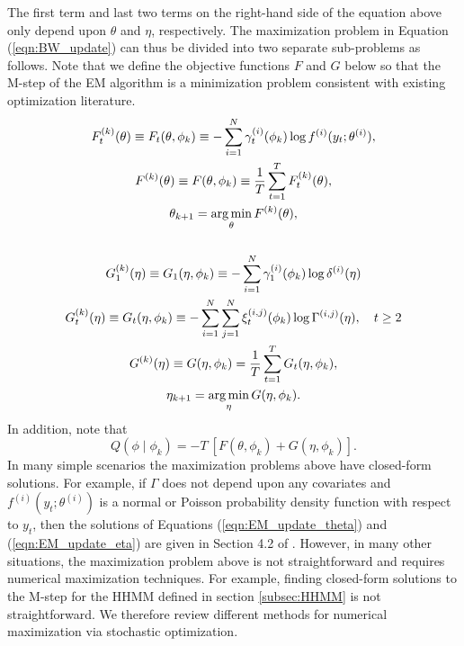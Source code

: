 The first term and last two terms on the right-hand side of the equation above only depend upon $\theta$ and $\eta$, respectively. The maximization problem in Equation (\ref{eqn:BW_update}) can thus be divided into two separate sub-problems as follows. Note that we define the objective functions $F$ and $G$ below so that the M-step of the EM algorithm is a minimization problem consistent with existing optimization literature.
%
\begin{gather}
    F_t^{(k)}(\theta) \equiv F_t(\theta, \phi_{k}) \equiv - \sum_{i=1}^N \gamma^{(i)}_t(\phi_{k}) \log f^{(i)}(y_t;\theta^{(i)}), \\
    F^{(k)}(\theta) \equiv F(\theta, \phi_{k}) \equiv \frac{1}{T} \sum_{t=1}^T F^{(k)}_t(\theta), \label{eqn:F} \\
    \theta_{k+1} = \operatorname*{arg\,min}_{\theta} F^{(k)}(\theta), \label{eqn:EM_update_theta} \\ \nonumber \\
    G_1^{(k)}(\eta) \equiv G_1(\eta, \phi_{k}) \equiv - \sum_{i=1}^N \gamma^{(i)}_1(\phi_{k}) \log \delta^{(i)}(\eta) \\
    G_t^{(k)}(\eta) \equiv G_t(\eta, \phi_{k}) \equiv - \sum_{i=1}^N \sum_{j=1}^N \xi^{(i,j)}_t(\phi_{k}) \log \Gamma^{(i,j)}(\eta), \quad t \geq 2 \\
    G^{(k)}(\eta) \equiv G(\eta, \phi_{k}) = \frac{1}{T} \sum_{t=1}^{T} G_t(\eta, \phi_{k}), \label{eqn:G}\\
    \eta_{k+1} = \operatorname*{arg\,min}_{\eta} G(\eta,\phi_{k}). \label{eqn:EM_update_eta}
\end{gather}
In addition, note that 
\begin{equation}
   Q(\phi \mid \phi_{k}) = -T ~ \left[F(\theta, \phi_{k}) + G(\eta, \phi_{k})\right].
\end{equation}
%
In many simple scenarios the maximization problems above have closed-form solutions. For example, if $\Gamma$ does not depend upon any covariates and $f^{(i)}(y_t;\theta^{(i)})$ is a normal or Poisson probability density function with respect to $y_t$, then the solutions of Equations (\ref{eqn:EM_update_theta}) and (\ref{eqn:EM_update_eta}) are given in Section 4.2 of \citet{Zucchini:2016}. However, in many other situations, the maximization problem above is not straightforward and requires numerical maximization techniques. For example, finding closed-form solutions to the M-step for the HHMM defined in section \ref{subsec:HHMM} is not straightforward. We therefore review different methods for numerical maximization via stochastic optimization. %

